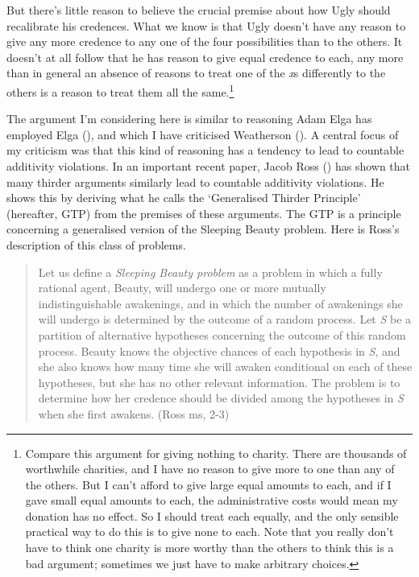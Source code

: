 \documentclass[
  11pt,
  letterpaper,
  DIV=11,
  numbers=noendperiod,
  twoside]{scrartcl}
\begin{document}
But there's little reason to believe the crucial premise about how Ugly
should recalibrate his credences. What we know is that Ugly doesn't have
any reason to give any more credence to any one of the four
possibilities than to the others. It doesn't at all follow that he has
reason to give equal credence to each, any more than in general an
absence of reasons to treat one of the \emph{x}s differently to the
others is a reason to treat them all the same.\footnote{Compare this
  argument for giving nothing to charity. There are thousands of
  worthwhile charities, and I have no reason to give more to one than
  any of the others. But I can't afford to give large equal amounts to
  each, and if I gave small equal amounts to each, the administrative
  costs would mean my donation has no effect. So I should treat each
  equally, and the only sensible practical way to do this is to give
  none to each. Note that you really don't have to think one charity is
  more worthy than the others to think this is a bad argument; sometimes
  we just have to make arbitrary choices.}

The argument I'm considering here is similar to reasoning Adam Elga has
employed Elga (), and which I have
criticised Weatherson (). A
central focus of my criticism was that this kind of reasoning has a
tendency to lead to countable additivity violations. In an important
recent paper, Jacob Ross () has shown that
many thirder arguments similarly lead to countable additivity
violations. He shows this by deriving what he calls the `Generalised
Thirder Principle' (hereafter, GTP) from the premises of these
arguments. The GTP is a principle concerning a generalised version of
the Sleeping Beauty problem. Here is Ross's description of this class of
problems.

\begin{quote}
Let us define a \emph{Sleeping Beauty problem} as a problem in which a
fully rational agent, Beauty, will undergo one or more mutually
indistinguishable awakenings, and in which the number of awakenings she
will undergo is determined by the outcome of a random process. Let
\emph{S} be a partition of alternative hypotheses concerning the outcome
of this random process. Beauty knows the objective chances of each
hypothesis in \emph{S}, and she also knows how many time she will awaken
conditional on each of these hypotheses, but she has no other relevant
information. The problem is to determine how her credence should be
divided among the hypotheses in \emph{S} when she first awakens. (Ross
ms, 2-3)
\end{quote}
\end{document}
